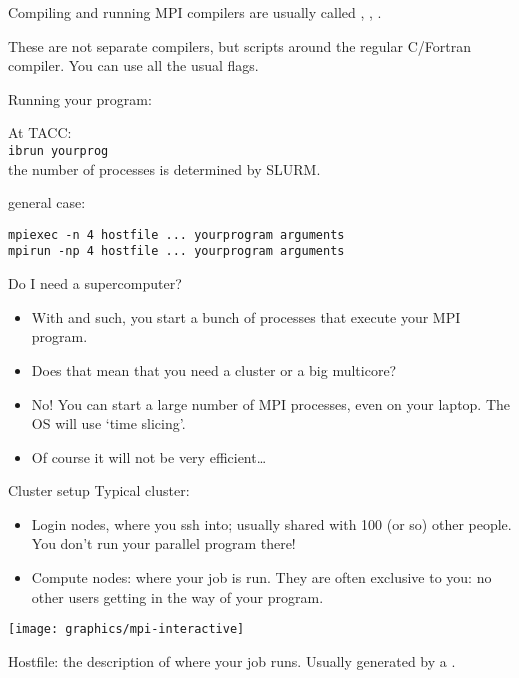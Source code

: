 

\begin{frame}[containsverbatim]{Compiling and running}
  MPI compilers are usually called ,
  , .

  These are not separate compilers,
  but scripts around the regular C/Fortran compiler. You can use all
  the usual flags.

  Running your program:
\begin{tacc}
  At TACC:\\
  \verb+ibrun yourprog+\\
  the number of processes is determined by SLURM.
\end{tacc}
general case:
\begin{verbatim}
mpiexec -n 4 hostfile ... yourprogram arguments
mpirun -np 4 hostfile ... yourprogram arguments
\end{verbatim}
\end{frame}

\begin{frame}[containsverbatim]{Do I need a supercomputer?}
  \begin{itemize}
  \item With  and such, you start a bunch of processes that
    execute your MPI program.
  \item Does that mean that you need a cluster or a big multicore?
  \item No! You can start a large number of MPI processes, even on
    your laptop. The OS will use `time slicing'.
  \item Of course it will not be very efficient\ldots
  \end{itemize}
\end{frame}

\begin{frame}{Cluster setup}
  \small
  Typical cluster:
  \begin{itemize}
  \item Login nodes, where you ssh into; usually shared with 100 (or
    so) other people. You don't run your parallel program there!
  \item Compute nodes: where your job is run. They are often exclusive
    to you: no other users getting in the way of your program.
  \end{itemize}
  \texttt{[image: graphics/mpi-interactive]}

  Hostfile: the description of where your job runs. Usually generated
  by a .
\end{frame}

